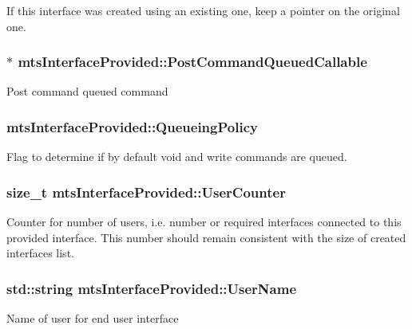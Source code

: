 If this interface was created using an existing one, keep a pointer on the original one. \hypertarget{classmts_interface_provided_af7e4e42c17eea4b0a71fa7650a34a120}{
\subsubsection[{Post\-Command\-Queued\-Callable}]{$\ast$ mts\-Interface\-Provided\-::\-Post\-Command\-Queued\-Callable\hspace{0.3cm}{\ttfamily [protected]}}}\label{classmts_interface_provided_af7e4e42c17eea4b0a71fa7650a34a120}
Post command queued command \hypertarget{classmts_interface_provided_aa46d6cd890786ba31c40c8e7882fc9a3}{
\subsubsection[{Queueing\-Policy}]{ mts\-Interface\-Provided\-::\-Queueing\-Policy\hspace{0.3cm}{\ttfamily [protected]}}}\label{classmts_interface_provided_aa46d6cd890786ba31c40c8e7882fc9a3}
Flag to determine if by default void and write commands are queued. \hypertarget{classmts_interface_provided_a6a475bd79ec48c9db26b25c7d4e0a40f}{
\subsubsection[{User\-Counter}]{\setlength{\rightskip}{0pt plus 5cm}size\-\_\-t mts\-Interface\-Provided\-::\-User\-Counter\hspace{0.3cm}{\ttfamily [protected]}}}\label{classmts_interface_provided_a6a475bd79ec48c9db26b25c7d4e0a40f}
Counter for number of users, i.\-e. number or required interfaces connected to this provided interface. This number should remain consistent with the size of created interfaces list. \hypertarget{classmts_interface_provided_a37bb4e89240cb1056a013d9aa9b1d2aa}{
\subsubsection[{User\-Name}]{\setlength{\rightskip}{0pt plus 5cm}std\-::string mts\-Interface\-Provided\-::\-User\-Name\hspace{0.3cm}{\ttfamily [protected]}}}\label{classmts_interface_provided_a37bb4e89240cb1056a013d9aa9b1d2aa}
Name of user for end user interface 


